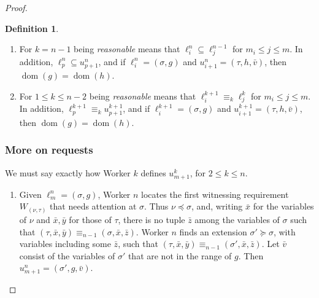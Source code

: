 \documentclass{article}
\DeclareMathOperator{\dom}{dom}
\theoremstyle{definition}
\newtheorem{defn}[thm]{Definition}
\begin{document}
\begin{proof}
\begin{defn}
\begin{enumerate}
				\item For $k = n-1$ being \emph{reasonable} means that $\ell^n_i\subseteq\ell^{n-1}_j$ for $m_i\leq j\leq m$.  In addition, $\ell^n_p\subseteq u^n_{p+1}$, and if $\ell^n_i = (\sigma,g)$ and $u^n_{i+1} = (\tau,h,\bar{v})$, then $\dom(g) = \dom(h)$.
				
				\item For $1\leq k\leq n-2$ being \emph{reasonable} means that $\ell^{k+1}_i\equiv_k\ell^k_j$ for $m_i\leq j\leq m$. In addition, $\ell^{k+1}_p\equiv_k u^{k+1}_{p+1}$, and if $\ell^{k+1}_i = (\sigma,g)$ and $u^{k+1}_{i+1} = (\tau,h,\bar{v})$, then $\dom(g) = \dom(h)$.
				
			\end{enumerate}
			
		\end{defn} 
		
		\subsubsection{More on requests}
		
		We must say exactly how Worker $k$ defines $u^k_{m+1}$, for $2\leq k\leq n$.
		
		\begin{enumerate}
			
			\item Given $\ell^n_m = (\sigma,g)$, Worker $n$ locates the first
				witnessing requirement $W_{(\nu,\tau)}$ that needs attention at
				$\sigma$. Thus $\nu\preceq\sigma$, and, writing $\bar{x}$ for the
				variables of $\nu$ and $\bar{x},\bar{y}$ for those of $\tau$, there is
				no tuple $\bar{z}$ among the variables of $\sigma$ such that $(\tau,\bar{x},\bar{y})\equiv_{n-1}(\sigma,\bar{x},\bar{z})$.
				Worker $n$ finds an extension $\sigma'\succeq\sigma$, with variables
				including some $\bar{z}$, such that $(\tau,\bar{x},\bar{y})\equiv_{n-1}(\sigma',\bar{x},\bar{z})$.
				Let $\bar{v}$ consist of the variables of $\sigma'$ that are not in
				the range of $g$. Then $u^n_{m+1}=(\sigma',g,\bar{v})$.
			

\end{enumerate}
\end{proof}
\end{document}
